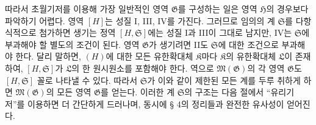 
따라서 초월기저를 이용해 가장 일반적인 영역 $\mathfrak G$를 구성하는 일은 영역 $\mathfrak H$의 경우보다 파악하기 어렵다. 영역 $[H]$는 성질 I, III, IV를 가진다. 그러므로 임의의 계 $\mathfrak S$를 다항식적으로 첨가하면 생기는 정역 $[H,\mathfrak S]$에는 성질 I과 III이 그대로 남지만, IV는 $\mathfrak S$에 부과해야 할 별도의 조건이 된다. 영역 $\mathfrak G$가 생기려면 II도 $\mathfrak S$에 대한 조건으로 부과해야 한다. 달리 말하면, $(H)$에 대한 모든 유한확대체 $\mathfrak K$마다 $\mathfrak K$의 유한확대체 $\mathfrak L$이 존재하여, $[H,\mathfrak S]$가 $\mathfrak L$의 한 원시원소를 포함해야 한다. 역으로 $\mathfrak M(\mathfrak G)$의 각 영역 $\mathfrak G$도 $[H,\mathfrak S]$ 꼴로 나타낼 수 있다. 따라서 $\mathfrak S$가 이와 같이 제한된 모든 계를 두루 취하게 하면 $\mathfrak M(\mathfrak G)$의 모든 영역 $\mathfrak G$를 얻는다. 이러한 계 $\mathfrak S$의 구조는 다음 절에서 ``유리기저''를 이용하면 더 간단하게 드러나며, 동시에 § 4의 정리들과 완전한 유사성이 얻어진다.

